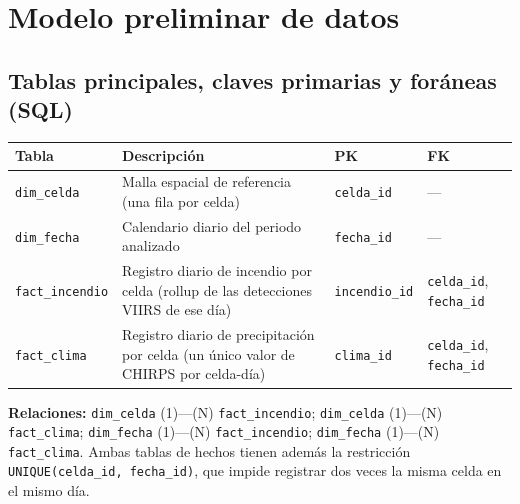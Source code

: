 \documentclass[11pt,a4paper]{article}
\begin{document}
\section{Modelo preliminar de datos}

\subsection{Tablas principales, claves primarias y for\'aneas (SQL)}

\begin{center}
\small
\begin{tabular}{@{}L{3.0cm}L{6.6cm}C{2.3cm}C{3.2cm}@{}}
\toprule
\textbf{Tabla} & \textbf{Descripci\'on} & \textbf{PK} & \textbf{FK} \\
\midrule
\texttt{dim\_celda} & Malla espacial de referencia (una fila por celda) & \texttt{celda\_id} & --- \\
\texttt{dim\_fecha} & Calendario diario del periodo analizado & \texttt{fecha\_id} & --- \\
\texttt{fact\_incendio} & Registro diario de incendio por celda (rollup de las detecciones VIIRS de ese d\'ia) & \texttt{incendio\_id} & \texttt{celda\_id}, \texttt{fecha\_id} \\
\texttt{fact\_clima} & Registro diario de precipitaci\'on por celda (un \'unico valor de CHIRPS por celda-d\'ia) & \texttt{clima\_id} & \texttt{celda\_id}, \texttt{fecha\_id} \\
\bottomrule
\end{tabular}
\end{center}

\noindent\textbf{Relaciones:} \texttt{dim\_celda} (1)---(N) \texttt{fact\_incendio}; \texttt{dim\_celda} (1)---(N) \texttt{fact\_clima}; \texttt{dim\_fecha} (1)---(N) \texttt{fact\_incendio}; \texttt{dim\_fecha} (1)---(N) \texttt{fact\_clima}. Ambas tablas de hechos tienen adem\'as la restricci\'on \texttt{UNIQUE(celda\_id, fecha\_id)}, que impide registrar dos veces la misma celda en el mismo d\'ia.
\end{document}
